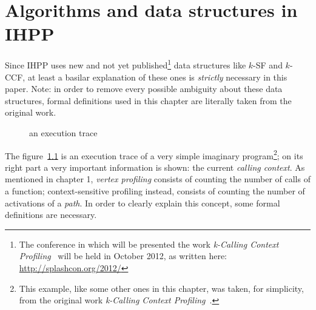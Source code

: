 \documentclass[a4paper,10pt]{report}
\begin{document}
\chapter{Algorithms and data structures in IHPP}
Since IHPP uses new and not yet published\footnote{The conference in which will be presented the work \emph{k-Calling Context
Profiling}~\cite{kccf} will be held in October 2012, as written here:
\mbox{\url{http://splashcon.org/2012/}}} data structures like $k$-SF and $k$-CCF, at least a basilar explanation of these ones is \emph{strictly} necessary in this paper. 
Note: in order to remove every possible ambiguity about these data structures, 
formal definitions used in this chapter are literally taken from the original work.

\begin{figure}
\begin{center}


\caption{an execution trace}
\label{callex1}
\end{center}
\end{figure}
The figure~\ref{callex1} is an execution trace of a very simple imaginary program\footnote{This example, like some other ones in this chapter, was taken, for simplicity, from the original work \emph{k-Calling Context Profiling}~\cite{kccf}.}; on its right part a very important information is shown: the current \emph{calling context}. 
As mentioned in chapter 1, \emph{vertex profiling} consists of counting the number of calls of a function; context-sensitive profiling instead, consists of counting the number of activations of a \emph{path}. In order to clearly explain this concept, some formal definitions are necessary.
\end{document}
